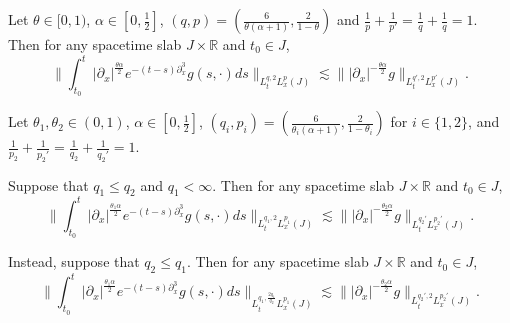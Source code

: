 \documentclass[10pt,a4paper]{amsart}
\newcommand{\R}{\mathbb{R}}
\begin{document}
\begin{lemma}\label{prel/strichartz-basic}
    Let $\theta \in [0,1)$, $\alpha \in [0,\frac{1}{2}]$, $(q,p) = (\frac{6}{\theta(\alpha + 1)},\frac{2}{1-\theta})$ and $\frac{1}{p} + \frac{1}{p'} = \frac{1}{q} + \frac{1}{q} = 1$. Then for any spacetime slab $J \times \R$ and $t_0 \in J$,
    \begin{equation*}
        \bigg\|\int_{t_0}^t |\partial_x|^\frac{\theta\alpha}{2} e^{-(t-s)\partial_x^3} g(s,\cdot) ds\bigg\|_{L_t^{q,2}L_x^{p}(J)} \lesssim \big\||\partial_x|^{-\frac{\theta\alpha}{2}}g\big\|_{L_t^{q',2}L_x^{p'}(J)}.
    \end{equation*}
\end{lemma}

\begin{proposition}\label{prel/strichartz}
    Let $\theta_1,\theta_2 \in (0,1)$, $\alpha \in [0,\frac{1}{2}]$, $(q_i,p_i) = (\frac{6}{\theta_i(\alpha + 1)},\frac{2}{1-\theta_i})$ for $i \in \{1,2\}$, and $\frac{1}{p_2} + \frac{1}{p_2'} = \frac{1}{q_2} + \frac{1}{q_2'} = 1$.

    Suppose that $q_1 \leq q_2$ and $q_1 < \infty$. Then for any spacetime slab $J \times \R$ and $t_0 \in J$,
    \begin{equation*}
        \bigg\|\int_{t_0}^t |\partial_x|^\frac{\theta_1\alpha}{2} e^{-(t-s)\partial_x^3} g(s,\cdot) ds\bigg\|_{L_t^{q_1,2}L_x^{p_1}(J)} \lesssim \big\||\partial_x|^{-\frac{\theta_2\alpha}{2}}g\big\|_{L_t^{q_2'}L_x^{p_2'}(J)}.
    \end{equation*}

    Instead, suppose that $q_2 \leq q_1$. Then for any spacetime slab $J \times \R$ and $t_0 \in J$,
    \begin{equation*}
        \bigg\|\int_{t_0}^t |\partial_x|^\frac{\theta_1\alpha}{2} e^{-(t-s)\partial_x^3} g(s,\cdot) ds\bigg\|_{L_t^{q_1,\frac{2q_1}{q_2}}L_x^{p_1}(J)} \lesssim \big\||\partial_x|^{-\frac{\theta_2\alpha}{2}}g\big\|_{L_t^{q_2',2}L_x^{p_2'}(J)}.
    \end{equation*}
\end{proposition}
\end{document}
